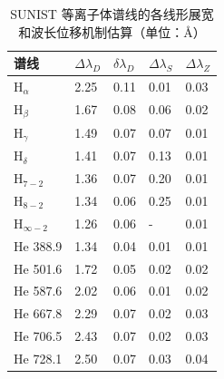 \begin{table}[H]
\caption{SUNIST 等离子体谱线的各线形展宽和波长位移机制估算（单位：\AA）}
\label{tab:SUNIST:lines-estimate}
\begin{center}
\begin{tabular}{p{6em}p{4em}p{4em}p{4em}l}%
\toprule[1.5pt]
    谱线 & $\Delta\lambda_D$ & $\delta\lambda_D$ & $\Delta\lambda_S$ & $\Delta\lambda_Z$\\
\midrule[1pt]
     H$_\alpha$ & 2.25 & 0.11 & 0.01 & 0.03 \\
     H$_\beta$ & 1.67 & 0.08 & 0.06 & 0.02 \\
     H$_\gamma$ & 1.49 & 0.07 & 0.07 & 0.01 \\
     H$_\delta$ & 1.41 & 0.07 & 0.13 & 0.01 \\
     H$_{7-2}$ & 1.36 & 0.07 & 0.20 & 0.01 \\
     H$_{8-2}$ & 1.34 & 0.06 & 0.25 & 0.01 \\
 H$_{\infty-2}$ & 1.26 & 0.06 & - & 0.01 \\ \addlinespace[.5em]
     He 388.9 & 1.34 & 0.04 & 0.01 & 0.01 \\
     He 501.6 & 1.72 & 0.05 & 0.02 & 0.02 \\
     He 587.6 & 2.02 & 0.06 & 0.01 & 0.02 \\
     He 667.8 & 2.29 & 0.07 & 0.02 & 0.03 \\
     He 706.5 & 2.43 & 0.07 & 0.02 & 0.03 \\
     He 728.1 & 2.50 & 0.07 & 0.03 & 0.04 \\
\bottomrule[1.5pt]
\end{tabular}
\end{center}
\end{table}

